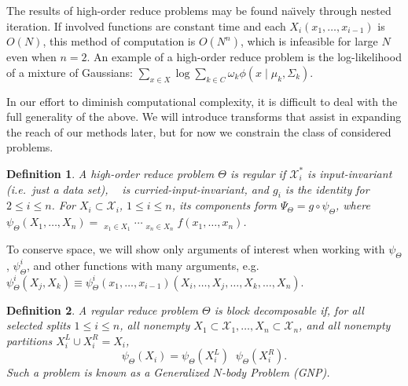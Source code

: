 \documentclass{article}
\newtheorem{definition} {Definition}
\newcommand{\OpSym}{\mathrm{O\!p}}
\newcommand{\opsym}{{\scriptstyle \mathrm{o\!p}}}
\newcommand{\OpCurry}[3][]{\mathop{\OpSym^{#1}_{#2}{#3}}}
\newcommand{\opcurry}[3][]{\mathop{\opsym^{#1}_{#2}{#3}}}
\newcommand{\Op}[2][]{\OpCurry[#1]{#2}{}}
\newcommand{\op}[2][]{\opcurry[#1]{#2}{}}
\newcommand{\comp}{\mathop{\circ}\nolimits}
\newcommand{\GNP}{\psi_{\Theta}}
\begin{document}
\noindent The results of high-order reduce problems may be found
na\"{\i}vely through nested iteration.  If involved functions are
constant time and each $X_i(x_1,\ldots,x_{i-1})$ is $O(N)$, this
method of computation is $O(N^n)$, which is infeasible for large $N$
even when $n = 2$.  An example of a high-order reduce problem is the
log-likelihood of a mixture of Gaussians: $\sum_{x \in X} \log \sum_{k
\in C} \omega_k \phi(x \mid \mu_k, \Sigma_k)$.

In our effort to diminish computational complexity, it is difficult to
deal with the full generality of the above.  We will introduce
transforms that assist in expanding the reach of our methods later,
but for now we constrain the class of considered problems.
\begin{definition}
  A high-order reduce problem $\Theta$ is {\em regular} if
  $\mathcal{X}^*_i$ is input-invariant (i.e.~just a data set),
  $\op{i}$ is curried-input-invariant, and $g_i$ is the identity for
  $2 \leq i \leq n$.  For $X_i \subset \mathcal{X}_i$, $1 \leq i \leq
  n$, its components form $\Psi_{\Theta} = g \comp \GNP$, where
  $\GNP(X_1,\ldots,X_n) = \Op{1}_{x_1 \in X_1}\cdots\Op{n}_{x_n \in
  X_n} f(x_1,\ldots,x_n)$.
\end{definition}
\noindent To conserve space, we will show only arguments of interest
when working with $\GNP$, $\GNP^i$, and other functions with many
arguments, e.g.~$\GNP^i(X_j,X_k) \equiv \GNP^i{\scriptstyle
(x_1,\ldots,x_{i-1})}(X_i,\ldots,X_j,\ldots,X_k,\ldots,X_n)$.
\begin{definition}
  A regular reduce problem $\Theta$ is {\em block decomposable} if,
  for all selected splits $1 \leq i \leq n$, all nonempty $X_1 \subset
  \mathcal{X}_1,\ldots,X_n \subset \mathcal{X}_n$, and all nonempty
  partitions $X^L_i \cup X^R_i = X_i$,
  \[
  \GNP(X_i) = \GNP(X^L_i) \op{i} \GNP(X^R_i).
  \]
  Such a problem is known as a {\em Generalized $N$-body
  Problem (GNP)}.
\end{definition}

\end{document}
